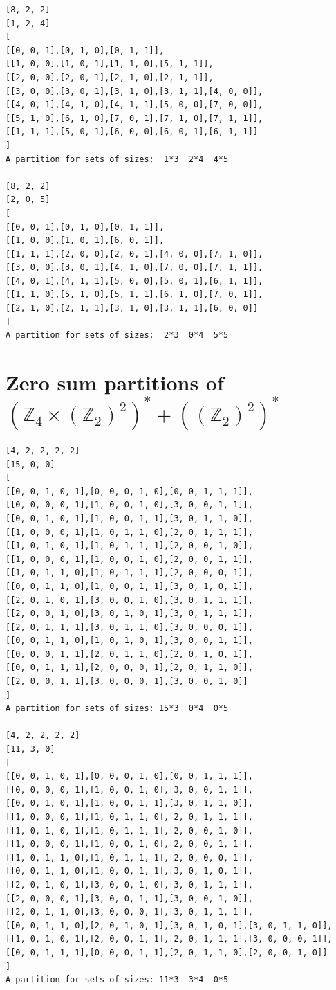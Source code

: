 \documentclass[final]{dmtcs-episciences}
\newcommand{\zet}{\mathbb{Z}}
\begin{document}
\begin{appendices}
\newpage

\begin{verbatim} 
[8, 2, 2]
[1, 2, 4]
[
[[0, 0, 1],[0, 1, 0],[0, 1, 1]],
[[1, 0, 0],[1, 0, 1],[1, 1, 0],[5, 1, 1]],
[[2, 0, 0],[2, 0, 1],[2, 1, 0],[2, 1, 1]],
[[3, 0, 0],[3, 0, 1],[3, 1, 0],[3, 1, 1],[4, 0, 0]],
[[4, 0, 1],[4, 1, 0],[4, 1, 1],[5, 0, 0],[7, 0, 0]],
[[5, 1, 0],[6, 1, 0],[7, 0, 1],[7, 1, 0],[7, 1, 1]],
[[1, 1, 1],[5, 0, 1],[6, 0, 0],[6, 0, 1],[6, 1, 1]]
]
A partition for sets of sizes:  1*3  2*4  4*5

[8, 2, 2]
[2, 0, 5]
[
[[0, 0, 1],[0, 1, 0],[0, 1, 1]],
[[1, 0, 0],[1, 0, 1],[6, 0, 1]],
[[1, 1, 1],[2, 0, 0],[2, 0, 1],[4, 0, 0],[7, 1, 0]],
[[3, 0, 0],[3, 0, 1],[4, 1, 0],[7, 0, 0],[7, 1, 1]],
[[4, 0, 1],[4, 1, 1],[5, 0, 0],[5, 0, 1],[6, 1, 1]],
[[1, 1, 0],[5, 1, 0],[5, 1, 1],[6, 1, 0],[7, 0, 1]],
[[2, 1, 0],[2, 1, 1],[3, 1, 0],[3, 1, 1],[6, 0, 0]]
]
A partition for sets of sizes:  2*3  0*4  5*5
\end{verbatim}

\newpage
\section{\texorpdfstring{Zero sum partitions of $\left(\zet_4\times(\zet_2)^{2}\right)^*+\left((\zet_2)^{2}\right)^*$}{Zero sum partitions of (Z4 x (Z2)**2)* + ((Z2)**2)*}}\label{a:422+22}
\begin{verbatim}
[4, 2, 2, 2, 2]
[15, 0, 0]
[
[[0, 0, 1, 0, 1],[0, 0, 0, 1, 0],[0, 0, 1, 1, 1]],
[[0, 0, 0, 0, 1],[1, 0, 0, 1, 0],[3, 0, 0, 1, 1]],
[[0, 0, 1, 0, 1],[1, 0, 0, 1, 1],[3, 0, 1, 1, 0]],
[[1, 0, 0, 0, 1],[1, 0, 1, 1, 0],[2, 0, 1, 1, 1]],
[[1, 0, 1, 0, 1],[1, 0, 1, 1, 1],[2, 0, 0, 1, 0]],
[[1, 0, 0, 0, 1],[1, 0, 0, 1, 0],[2, 0, 0, 1, 1]],
[[1, 0, 1, 1, 0],[1, 0, 1, 1, 1],[2, 0, 0, 0, 1]],
[[0, 0, 1, 1, 0],[1, 0, 0, 1, 1],[3, 0, 1, 0, 1]],
[[2, 0, 1, 0, 1],[3, 0, 0, 1, 0],[3, 0, 1, 1, 1]],
[[2, 0, 0, 1, 0],[3, 0, 1, 0, 1],[3, 0, 1, 1, 1]],
[[2, 0, 1, 1, 1],[3, 0, 1, 1, 0],[3, 0, 0, 0, 1]],
[[0, 0, 1, 1, 0],[1, 0, 1, 0, 1],[3, 0, 0, 1, 1]],
[[0, 0, 0, 1, 1],[2, 0, 1, 1, 0],[2, 0, 1, 0, 1]],
[[0, 0, 1, 1, 1],[2, 0, 0, 0, 1],[2, 0, 1, 1, 0]],
[[2, 0, 0, 1, 1],[3, 0, 0, 0, 1],[3, 0, 0, 1, 0]]
]
A partition for sets of sizes: 15*3  0*4  0*5

[4, 2, 2, 2, 2]
[11, 3, 0]
[
[[0, 0, 1, 0, 1],[0, 0, 0, 1, 0],[0, 0, 1, 1, 1]],
[[0, 0, 0, 0, 1],[1, 0, 0, 1, 0],[3, 0, 0, 1, 1]],
[[0, 0, 1, 0, 1],[1, 0, 0, 1, 1],[3, 0, 1, 1, 0]],
[[1, 0, 0, 0, 1],[1, 0, 1, 1, 0],[2, 0, 1, 1, 1]],
[[1, 0, 1, 0, 1],[1, 0, 1, 1, 1],[2, 0, 0, 1, 0]],
[[1, 0, 0, 0, 1],[1, 0, 0, 1, 0],[2, 0, 0, 1, 1]],
[[1, 0, 1, 1, 0],[1, 0, 1, 1, 1],[2, 0, 0, 0, 1]],
[[0, 0, 1, 1, 0],[1, 0, 0, 1, 1],[3, 0, 1, 0, 1]],
[[2, 0, 1, 0, 1],[3, 0, 0, 1, 0],[3, 0, 1, 1, 1]],
[[2, 0, 0, 0, 1],[3, 0, 0, 1, 1],[3, 0, 0, 1, 0]],
[[2, 0, 1, 1, 0],[3, 0, 0, 0, 1],[3, 0, 1, 1, 1]],
[[0, 0, 1, 1, 0],[2, 0, 1, 0, 1],[3, 0, 1, 0, 1],[3, 0, 1, 1, 0]],
[[1, 0, 1, 0, 1],[2, 0, 0, 1, 1],[2, 0, 1, 1, 1],[3, 0, 0, 0, 1]],
[[0, 0, 1, 1, 1],[0, 0, 0, 1, 1],[2, 0, 1, 1, 0],[2, 0, 0, 1, 0]]
]
A partition for sets of sizes: 11*3  3*4  0*5


\end{verbatim}
\end{appendices}
\end{document}

